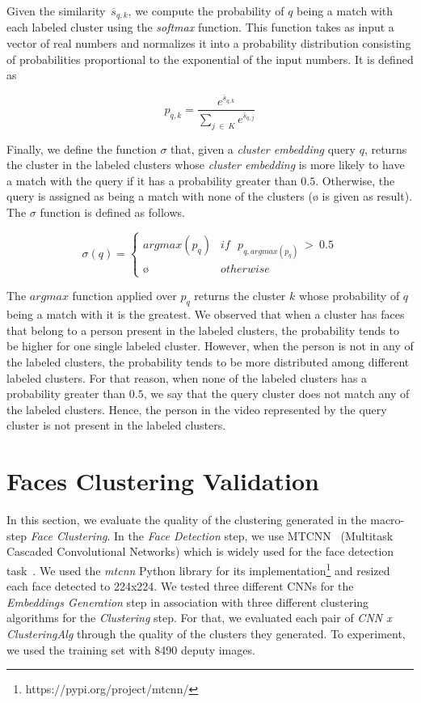 Given the similarity~$\overline{s}_{q,k}$, we compute the probability of $q$ being a match with each labeled cluster using the \emph{softmax} function.
This function takes as input a vector of real numbers and normalizes it into a probability distribution consisting of probabilities proportional to the exponential of the input numbers. 
It is defined as

\begin{equation}
\label{equation:probability}
    p_{q,k} = \frac{e^{\overline{s}_{q,k}}}{\sum_{j~\in~K}{e^{\overline{s}_{q,j}}}}
\end{equation}

Finally, we define the function $\sigma$ that, given a \emph{cluster embedding} query $q$, returns the cluster in the labeled clusters whose \emph{cluster embedding} is more likely to have a match with the query if it has a probability greater than $0.5$. Otherwise, the query is assigned as being a match with none of the clusters ($\text{\o}$ is given as result). The $\sigma$ function is defined as follows.

\begin{equation}
\label{equation:sigma}
    \sigma{(q)} = \begin{cases}argmax(p_q) & if~~~p_{q,argmax(p_q)}~>~0.5\\\text{\o} & otherwise\end{cases}
\end{equation}

The $argmax$ function applied over $p_q$ returns the cluster $k$ whose probability of $q$ being a match with it is the greatest. 
We observed that when a cluster has faces that belong to a person present in the labeled clusters, the probability tends to be higher for one single labeled cluster.
However, when the person is not in any of the labeled clusters, the probability tends to be more distributed among different labeled clusters.
For that reason, when none of the labeled clusters has a probability greater than $0.5$, we say that the query cluster does not match any of the labeled clusters.
Hence, the person in the video represented by the query cluster is not present in the labeled clusters.

\section{Faces Clustering Validation}
\label{sec:recognition_clustering_validation}

In this section, we evaluate the quality of the clustering generated in the macro-step \emph{Face Clustering}.
In the \emph{Face Detection} step, we use MTCNN~\cite{mtcnn} (Multitask
Cascaded Convolutional Networks) which is widely used for the face detection task~\cite{mtcnn1, mtcnn3}.
We used the  \emph{mtcnn} Python library for its implementation\footnote{https://pypi.org/project/mtcnn/} and resized each face detected to 224x224.
We tested three different CNNs for the \emph{Embeddings Generation} step in association with three different clustering algorithms for the \emph{Clustering} step.
For that, we evaluated each pair of \emph{CNN x ClusteringAlg} through the quality of the clusters they generated. 
To experiment, we used the training set with 8490 deputy images.

